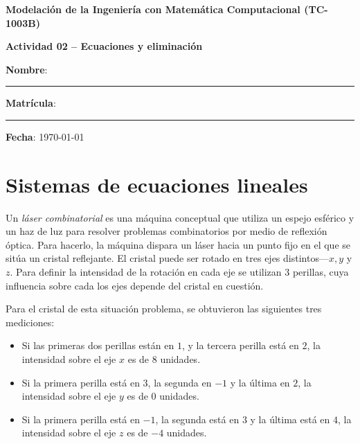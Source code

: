 \documentclass[spanish, 10pt]{article}
\begin{document}
\begin{center}
	{\Large \textbf{Modelación de la Ingeniería con Matemática Computacional (TC-1003B)}}
	
	\bigskip
	{\large \textbf{Actividad 02 -- Ecuaciones y eliminación}}
\end{center}

\bigskip
{\large \textbf{Nombre}: \rule{13.7 cm}{0.4mm}}



\bigskip
{\large \textbf{Matrícula}: \rule{5 cm}{0.4mm}} \hfill {\large \textbf{Fecha}: \today}

\bigskip


\section{Sistemas de ecuaciones lineales}

\vspace{3ex}

Un \textit{láser combinatorial} es una máquina conceptual que utiliza un espejo esférico y un haz de luz para resolver problemas combinatorios por medio de reflexión óptica.
Para hacerlo, la máquina dispara un láser hacia un punto fijo en el que se sitúa un cristal reflejante.
El cristal puede ser rotado en tres ejes distintos---$x, y $ y $z$.
Para definir la intensidad de la rotación en cada eje se utilizan 3 perillas, cuya influencia sobre cada los ejes depende del cristal en cuestión.

Para el cristal de esta situación problema, se obtuvieron las siguientes tres mediciones:

\begin{itemize}
    \item Si las primeras dos perillas están en $1$, y la tercera perilla está en $2$, la intensidad sobre el eje $x$ es de $8$ unidades.
    \item Si la primera perilla está en $3$, la segunda en $-1$ y la última en $2$, la intensidad sobre el eje $y$ es de $0$ unidades.
    \item Si la primera perilla está en $-1$, la segunda está en $3$ y la última está en $4$, la intensidad sobre el eje $z$ es de $-4$ unidades.
\end{itemize}
\end{document}
